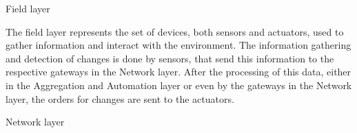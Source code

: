 \begin{Paragraph}{Field layer}
	
The field layer represents the set of devices, both sensors and actuators, used to gather information and interact with the environment. The information gathering and detection of changes is done by sensors, that send this information to the respective gateways in the Network layer. After the processing of this data, either in the Aggregation and Automation layer or even by the gateways in the Network layer, the orders for changes are sent to the actuators.
	
\end{Paragraph}

\begin{Paragraph}{Network layer}
	

	
\end{Paragraph}









